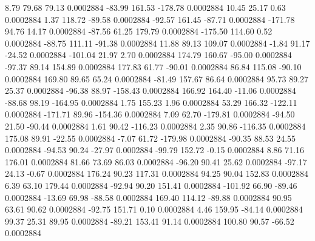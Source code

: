         8.79       79.68       79.13     0.0002884
      -83.99      161.53     -178.78     0.0002884
       10.45       25.17        0.63     0.0002884
        1.37      118.72      -89.58     0.0002884
      -92.57      161.45      -87.71     0.0002884
     -171.78       94.76       14.17     0.0002884
      -87.56       61.25      179.79     0.0002884
     -175.50      114.60        0.52     0.0002884
      -88.75      111.11      -91.38     0.0002884
       11.88       89.13      109.07     0.0002884
       -1.84       91.17      -24.52     0.0002884
     -101.04       21.97        2.70     0.0002884
      174.79      160.67      -95.00     0.0002884
      -97.37       89.14      154.89     0.0002884
      177.83       61.77      -90.01     0.0002884
       86.84      115.08      -90.10     0.0002884
      169.80       89.65       65.24     0.0002884
      -81.49      157.67       86.64     0.0002884
       95.73       89.27       25.37     0.0002884
      -96.38       88.97     -158.43     0.0002884
      166.92      164.40      -11.06     0.0002884
      -88.68       98.19     -164.95     0.0002884
        1.75      155.23        1.96     0.0002884
       53.29      166.32     -122.11     0.0002884
     -171.71       89.96     -154.36     0.0002884
        7.09       62.70     -179.81     0.0002884
      -94.50       21.50      -90.44     0.0002884
        1.61       90.42     -116.23     0.0002884
        2.35       90.86     -116.35     0.0002884
      175.08       89.91      -22.55     0.0002884
       -7.07       61.72     -179.98     0.0002884
      -90.35       88.53       24.55     0.0002884
      -94.53       90.24      -27.97     0.0002884
      -99.79      152.72       -0.15     0.0002884
        8.86       71.16      176.01     0.0002884
       81.66       73.69       86.03     0.0002884
      -96.20       90.41       25.62     0.0002884
      -97.17       24.13       -0.67     0.0002884
      176.24       90.23      117.31     0.0002884
       94.25       90.04      152.83     0.0002884
        6.39       63.10      179.44     0.0002884
      -92.94       90.20      151.41     0.0002884
     -101.92       66.90      -89.46     0.0002884
      -13.69       69.98      -88.58     0.0002884
      169.40      114.12      -89.88     0.0002884
       90.95       63.61       90.62     0.0002884
      -92.75      151.71        0.10     0.0002884
        4.46      159.95      -84.14     0.0002884
       99.37       25.31       89.95     0.0002884
      -89.21      153.41       91.14     0.0002884
      100.80       90.57      -66.52     0.0002884
